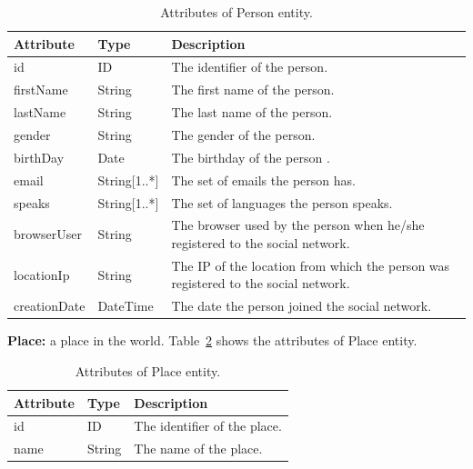 \begin{table}[H]
    \begin{tabular}{|p{2.5cm}|p{2.5cm}|p{10.5cm}|}
        \hline
        \textbf{Attribute} & \textbf{Type} & \textbf{Description} \\
        \hline
        id & ID  & The identifier of the person.\\
        \hline
        firstName & String  & The first name of the person.\\
        \hline
        lastName & String  & The last name of the person.\\
        \hline
        gender & String  & The gender of the person.\\
        \hline
        birthDay & Date  & The birthday of the person .\\
        \hline
        email & String[1..*]  & The set of emails the person has.\\
        \hline
        speaks & String[1..*]  & The set of languages the person speaks.\\
        \hline
        browserUser & String  & The browser used by the person when he/she registered to the social network.\\
        \hline
        locationIp & String  & The IP of the location from which the person was registered to the social network.\\
        \hline
        creationDate & DateTime  & The date the person joined the social network.\\
        \hline
    \end{tabular}
    \caption{Attributes of Person entity.}
    \label{table:person}
\end{table}


{\flushleft \textbf{Place:}} a place in the world.
Table~\ref{table:place} shows the attributes of Place entity.

\begin{table}[H]
    \begin{tabular}{|p{2.5cm}|p{2.5cm}|p{10.5cm}|}
        \hline
        \textbf{Attribute} & \textbf{Type} & \textbf{Description} \\
        \hline
        id & ID  & The identifier of the place.\\
        \hline
        name & String  & The name of the place.\\
        \hline
    \end{tabular}
    \caption{Attributes of Place entity.}
    \label{table:place}
\end{table}


